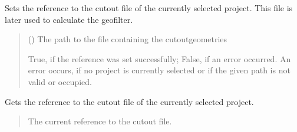 \documentclass[letterpaper,10pt,english]{sphinxmanual}
\begin{document}
\begin{fulllineitems}
\begin{fulllineitems}
\label{\detokenize{apidoc/src.osm_configurator.control:src.osm_configurator.control.control.Control.set_cut_out_reference}}
\pysigstartsignatures
{}
\pysigstopsignatures
\sphinxAtStartPar
Sets the reference to the cut\sphinxhyphen{}out file of the currently selected project.
This file is later used to calculate the geofilter.
\begin{quote}\begin{description}
\sphinxAtStartPar
{} () \textendash{} The path to the file containing the cut\sphinxhyphen{}out\sphinxhyphen{}geometries

\sphinxAtStartPar
True, if the reference was set successfully; False, if an error occurred. An error occurs, if no project is currently selected or if the given path is not valid or occupied.

\sphinxAtStartPar
{}

\end{description}\end{quote}

\end{fulllineitems}


\begin{fulllineitems}
\label{\detokenize{apidoc/src.osm_configurator.control:src.osm_configurator.control.control.Control.get_cut_out_reference}}
\pysigstartsignatures
{}
\pysigstopsignatures
\sphinxAtStartPar
Gets the reference to the cut\sphinxhyphen{}out file of the currently selected project.
\begin{quote}\begin{description}
\sphinxAtStartPar
The current reference to the cut\sphinxhyphen{}out file.

\sphinxAtStartPar
{}


\end{description}
\end{quote}
\end{fulllineitems}
\end{fulllineitems}
\end{document}
